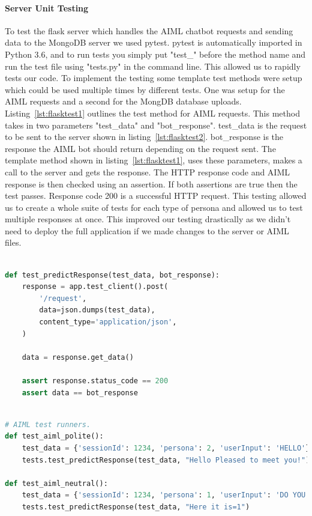 \paragraph{Server Unit Testing}
To test the flask server which handles the AIML chatbot requests and sending data to the MongoDB server we used pytest. pytest is automatically imported in Python 3.6, and to run tests you simply put "test\_" before the method name and run the test file using "tests.py" in the command line. This allowed us to rapidly tests our code. To implement the testing some template test methods were setup which could be used multiple times by different tests. One was setup for the AIML requests and a second for the MongDB database uploads. Listing~\ref{lst:flasktest1} outlines the test method for AIML requests. This method takes in two parameters "test\_data" and "bot\_response". test\_data is the request to be sent to the server shown in listing~\ref{lst:flasktest2}. bot\_response is the response the AIML bot should return depending on the request sent. The template method shown in listing~\ref{lst:flasktest1}, uses these parameters, makes a call to the server and gets the response. The HTTP response code and AIML response is then checked using an assertion. If both assertions are true then the test passes. Response code 200 is a successful HTTP request. This testing allowed us to create a whole suite of tests for each type of persona and allowed us to test multiple responses at once. This improved our testing drastically as we didn't need to deploy the full application if we made changes to the server or AIML files.

\begin{lstlisting}[caption={pytest template method for testing AIML chatbot.},label={lst:flasktest1},language=python]

def test_predictResponse(test_data, bot_response):        
    response = app.test_client().post(
        '/request',
        data=json.dumps(test_data),
        content_type='application/json',
    )

    data = response.get_data()

    assert response.status_code == 200
    assert data == bot_response

\end{lstlisting}

\begin{lstlisting}[caption={pytest AIML runner methods which call template methods.},label={lst:flasktest2},language=python]

# AIML test runners.
def test_aiml_polite():
    test_data = {'sessionId': 1234, 'persona': 2, 'userInput': 'HELLO'}
    tests.test_predictResponse(test_data, "Hello Pleased to meet you!")

def test_aiml_neutral():
    test_data = {'sessionId': 1234, 'persona': 1, 'userInput': 'DO YOU HAVE A TICKET'}
    tests.test_predictResponse(test_data, "Here it is=1")

\end{lstlisting}

